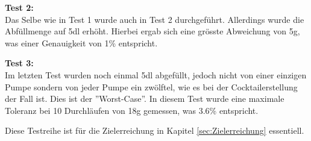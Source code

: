 \textbf{Test 2:} \\
Das Selbe wie in Test 1 wurde auch in Test 2 durchgeführt. Allerdings wurde die Abfüllmenge auf 5dl erhöht. Hierbei ergab sich eine grösste Abweichung von 5g, was einer Genauigkeit von 1\% entspricht.

\textbf{Test 3:} \\
Im letzten Test wurden noch einmal 5dl abgefüllt, jedoch nicht von einer einzigen Pumpe sondern von jeder Pumpe ein zwölftel, wie es bei der Cocktailerstellung der Fall ist. Dies ist der ''Worst-Case''. In diesem Test wurde eine maximale Toleranz bei 10 Durchläufen von 18g gemessen, was 3.6\% entspricht.

Diese Testreihe ist für die Zielerreichung in Kapitel \ref{sec:Zielerreichung} essentiell.